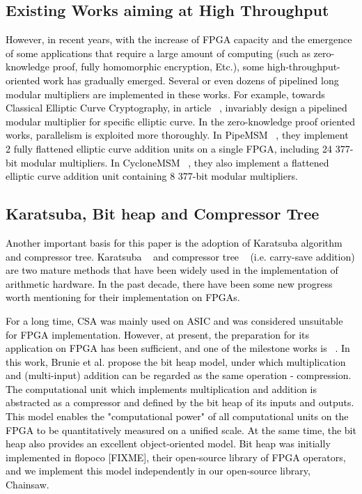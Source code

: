 \documentclass[conference]{IEEEtran}
\begin{document}
\subsection{Existing Works aiming at High Throughput}
\textcolor{black}{
However, in recent years, with the increase of FPGA capacity and the emergence of some applications that require a large amount of computing (such as zero-knowledge proof, fully homomorphic encryption, Etc.), some high-throughput-oriented work has gradually emerged. Several or even dozens of pipelined long modular multipliers are implemented in these works. For example, towards Classical Elliptic Curve Cryptography, in article ~\cite{A_High_performance_ECC_Processor_over_Curve448_based_on_a_Novel_Variant_of_the_Karatsuba_Formula_for_Asymmetric_Digit_Multiplier,  High_Speed_and_Unified_ECC_Processor_for_Generic_Weierstrass_Curves_over_GFp_on_FPGA,Fast_Small_and_Area_Time_Efficient_Architectures_for_Key_Exchange_on_Curve25519}, invariably design a pipelined modular multiplier for specific elliptic curve. In the zero-knowledge proof oriented works, parallelism is exploited more thoroughly. In PipeMSM ~\cite{PipeMSM}, they implement 2 fully flattened elliptic curve addition units on a single FPGA, including 24 377-bit modular multipliers. In CycloneMSM ~\cite{FPGA_Acceleration_of_Multi_Scalar_Multiplication_CycloneMSM}, they also implement a flattened elliptic curve addition unit containing 8 377-bit modular multipliers.
}

\subsection{Karatsuba, Bit heap and Compressor Tree}

\textcolor{black}{
Another important basis for  this paper is the adoption of Karatsuba algorithm and compressor tree. Karatsuba ~\cite{Multiplication_of_multidigit_numbers_on_automata}
 and compressor tree ~\cite{Advanced_Compressor_Tree_Synthesis_for_FPGAs} (i.e. carry-save addition) are two mature methods that have been widely used in the implementation of arithmetic hardware. In the past decade, there have been some new progress worth mentioning for their implementation on FPGAs.
}

\textcolor{black}{
For a long time, CSA was mainly used on ASIC and was considered unsuitable for FPGA implementation. However, at present, the preparation for its application on FPGA has been sufficient, and one of the milestone works is ~\cite{Arithmetic_core_generation_using_bit_heaps}. In this work, Brunie et al. propose the bit heap model, under which multiplication and (multi-input) addition can be regarded as the same operation  - compression. The computational unit which implements multiplication and addition is abstracted as a compressor and defined by the bit heap of its inputs and outputs. This model enables the "computational power" of all computational units on the FPGA to be quantitatively measured on a unified scale. At the same time, the bit heap also provides an excellent object-oriented model. Bit heap was initially implemented in flopoco [FIXME], their open-source library of FPGA operators, and we implement this model independently in our open-source library, Chainsaw.
}
\end{document}
